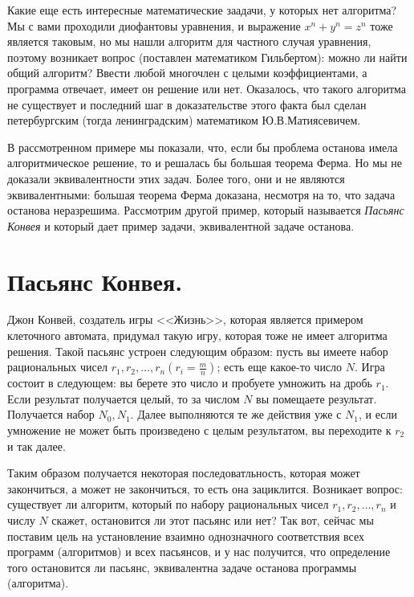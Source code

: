 \documentclass[russian]{lecture-notes}
\begin{document}
	Какие еще есть интересные математические заадачи, у которых нет алгоритма? Мы с вами проходили диофантовы уравнения, и выражение $x^n + y^n = z^n$ тоже является таковым, но мы нашли алгоритм для частного случая уравнения, поэтому возникает вопрос (поставлен математиком Гильбертом): можно ли найти общий алгоритм? Ввести любой многочлен с целыми коэффициентами, а программа отвечает, имеет он решение или нет. Оказалось, что такого алгоритма не существует и последний шаг в доказательстве этого факта был сделан петербургским (тогда ленинградским) математиком Ю.В.Матиясевичем.
	
	В рассмотренном примере мы показали, что, если бы проблема останова имела алгоритмическое решение, то и решалась бы большая теорема Ферма. Но мы не доказали эквивалентности этих задач. Более того, они и не являются эквивалентными: большая теорема Ферма доказана, несмотря на то, что задача останова неразрешима.  Рассмотрим другой пример, который называется {\em Пасьянс Конвея} и который дает пример задачи, эквивалентной задаче останова.
	
	\section*{Пасьянс Конвея.}
	
	Джон Конвей, создатель игры <<Жизнь>>, которая является примером клеточного автомата, придумал такую игру, которая тоже не имеет алгоритма решения. Такой пасьянс устроен следующим образом: пусть вы имеете набор рациональных чисел $r_1, r_2, \ldots, r_n (r_i = \frac{m}{n})$; есть еще какое-то число $N$. Игра состоит в следующем: вы берете это число и пробуете умножить на дробь $r_1$. Если результат получается целый, то за числом $N$ вы помещаете результат. Получается набор $N_0, N_1$. Далее выполняются те же действия уже с $N_1$, и если умножение не может быть произведено с целым результатом, вы переходите к $r_2$ и так далее. 
	
	Таким образом получается некоторая последоватльность, которая может закончиться, а может не закончиться, то есть она зациклится. Возникает вопрос: существует ли алгоритм, который по набору рациональных чисел $r_1, r_2, \ldots, r_n$ и числу $N$ скажет, остановится ли этот пасьянс или нет? Так вот, сейчас мы поставим цель на установление взаимно однозначного соответствия всех программ (алгоритмов) и всех пасьянсов, и у нас получится, что определение того остановится ли пасьянс, эквивалентна задаче останова программы (алгоритма). 
	
\end{document}
